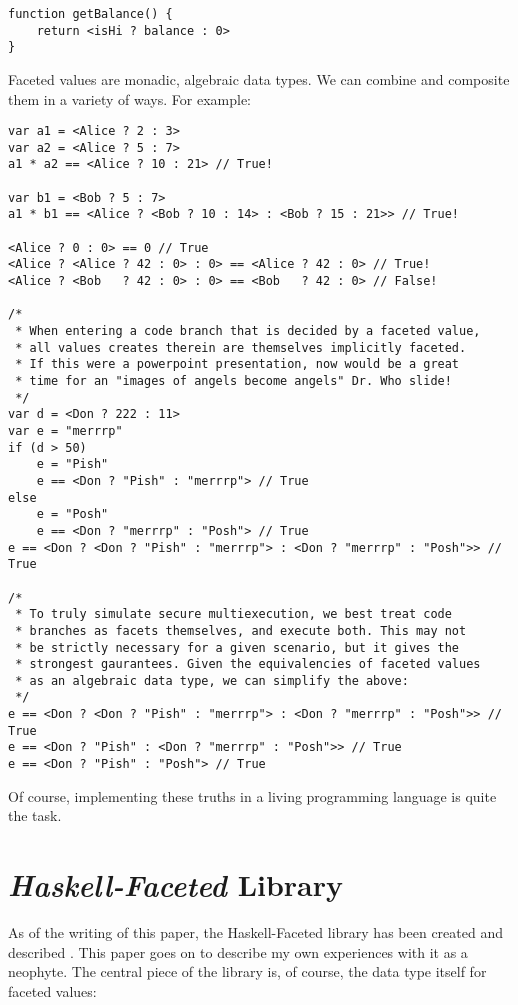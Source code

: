 \documentclass[12pt,a4paper]{article}
\begin{document}
		\begin{lstlisting}
function getBalance() {
	return <isHi ? balance : 0>
}
		\end{lstlisting}
		
		Faceted values are monadic, algebraic data types. We can combine and composite them in a variety of ways. For example:
		
		\begin{lstlisting}
var a1 = <Alice ? 2 : 3>
var a2 = <Alice ? 5 : 7>
a1 * a2 == <Alice ? 10 : 21> // True!

var b1 = <Bob ? 5 : 7>
a1 * b1 == <Alice ? <Bob ? 10 : 14> : <Bob ? 15 : 21>> // True!

<Alice ? 0 : 0> == 0 // True
<Alice ? <Alice ? 42 : 0> : 0> == <Alice ? 42 : 0> // True!
<Alice ? <Bob   ? 42 : 0> : 0> == <Bob   ? 42 : 0> // False!

/*
 * When entering a code branch that is decided by a faceted value, 
 * all values creates therein are themselves implicitly faceted. 
 * If this were a powerpoint presentation, now would be a great
 * time for an "images of angels become angels" Dr. Who slide!
 */
var d = <Don ? 222 : 11>
var e = "merrrp"
if (d > 50)
	e = "Pish"
	e == <Don ? "Pish" : "merrrp"> // True
else
	e = "Posh"
	e == <Don ? "merrrp" : "Posh"> // True
e == <Don ? <Don ? "Pish" : "merrrp"> : <Don ? "merrrp" : "Posh">> // True

/*
 * To truly simulate secure multiexecution, we best treat code 
 * branches as facets themselves, and execute both. This may not 
 * be strictly necessary for a given scenario, but it gives the
 * strongest gaurantees. Given the equivalencies of faceted values
 * as an algebraic data type, we can simplify the above:
 */
e == <Don ? <Don ? "Pish" : "merrrp"> : <Don ? "merrrp" : "Posh">> // True
e == <Don ? "Pish" : <Don ? "merrrp" : "Posh">> // True
e == <Don ? "Pish" : "Posh"> // True
		\end{lstlisting}
	
	Of course, implementing these truths in a living programming language is quite the task.
	
	\section{\textit{Haskell-Faceted} Library}
	
	As of the writing of this paper, the Haskell-Faceted library has been created and described \cite{AustinKnowlesFlanagan2014}. This paper goes on to describe my own experiences with it as a neophyte. The central piece of the library is, of course, the data type itself for faceted values:
	
\end{document}
